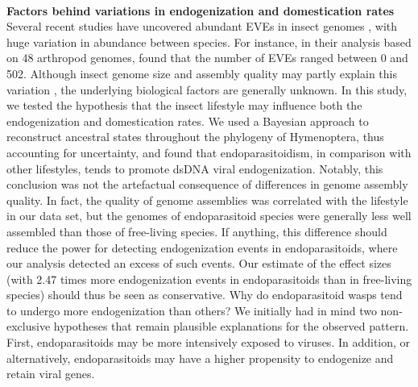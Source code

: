 \textbf{\\Factors behind variations in endogenization and domestication rates }
\\Several recent studies have uncovered abundant EVEs in insect genomes \citep{flynn_assessing_2019, ter_horst_endogenous_2019, russo_novel_2019}, with huge variation in abundance between species.  For instance, in their analysis based on 48 arthropod genomes, \citep{ter_horst_endogenous_2019} found that the number of EVEs ranged between 0 and 502. Although insect genome size and assembly quality may partly explain this variation \citep{gilbert_diversity_2022}, the underlying biological factors are generally unknown. In this study, we tested the hypothesis that the insect lifestyle may influence both the endogenization and domestication rates. We used a Bayesian approach to reconstruct ancestral states throughout the phylogeny of Hymenoptera, thus accounting for uncertainty, and found that endoparasitoidism, in comparison with other lifestyles, tends to promote dsDNA viral endogenization. Notably, this conclusion was not the artefactual consequence of differences in genome assembly quality. In fact, the quality of genome assemblies was correlated with the lifestyle in our data set, but the genomes of endoparasitoid species were generally less well assembled than those of free-living species. If anything, this difference should reduce the power for detecting endogenization events in endoparasitoids, where our analysis detected an excess of such events. Our estimate of the effect sizes (with 2.47 times more endogenization events in endoparasitoids than in  free-living species) should thus be seen as conservative. 
Why do endoparasitoid wasps tend to undergo more endogenization than others? We initially had in mind two non-exclusive hypotheses that remain plausible explanations for the observed pattern. First, endoparasitoids may be more intensively exposed to viruses. In addition, or alternatively, endoparasitoids may have a higher propensity to endogenize and retain viral genes. 

